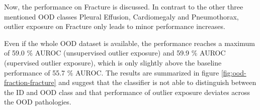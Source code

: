 \par
Now, the performance on Fracture is discussed.
In contrast to the other three mentioned OOD classes Pleural Effusion, Cardiomegaly and Pneumothorax, outlier exposure on Fracture only leads to minor performance increases.
\par
Even if the whole OOD dataset is available, the performance reaches a maximum of 59.0 \% AUROC (unsupervised outlier exposure) and 59.9 \% AUROC (supervised outlier exposure), which is only slightly above the baseline performance of 55.7 \% AUROC.
The results are summarized in figure \ref{fig:ood-fraction-fracture} and suggest that the classifier is not able to distinguish between the ID and OOD class and that performance of outlier exposure deviates across the OOD pathologies.  
